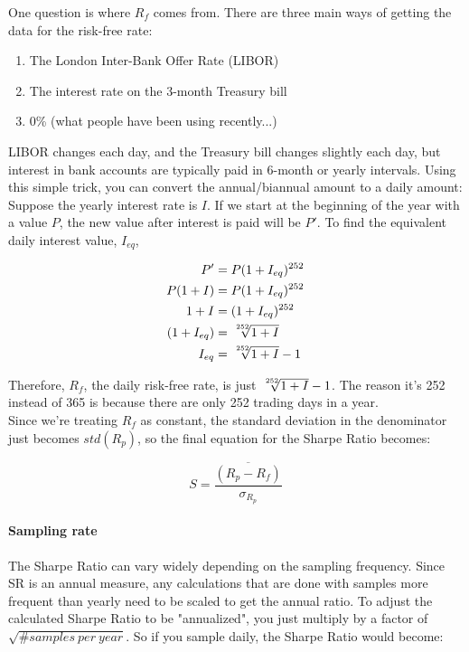 \noindent One question is where $R_f$ comes from. There are three main ways of getting the data for the risk-free rate:
\begin{enumerate}
	\item The London Inter-Bank Offer Rate (LIBOR)
	\item The interest rate on the 3-month Treasury bill
    \item 0\% (what people have been using recently...)
\end{enumerate}

\noindent LIBOR changes each day, and the Treasury bill changes slightly each day, but interest in bank accounts are typically paid in 6-month or yearly intervals. Using this simple trick, you can convert the annual/biannual amount to a daily amount:\\

\noindent Suppose the yearly interest rate is $I$. If we start at the beginning of the year with a value $P$, the new value after interest is paid will be $P'$. To find the equivalent daily interest value, $I_{eq}$,

\begin{align*}
	P' &= P(1+I_{eq})^{252}\\
    P(1+I) &= P(1+I_{eq})^{252}\\
    1+I &= (1+I_{eq})^{252}\\
    (1+I_{eq}) &= \sqrt[\leftroot{-2}\uproot{2}252]{1+I}\\
    I_{eq} &= \sqrt[\leftroot{-2}\uproot{2}252]{1+I} - 1
\end{align*}

\noindent Therefore, $R_f$, the daily risk-free rate, is just $\sqrt[\leftroot{-2}\uproot{2}252]{1+I} - 1$. The reason it's 252 instead of 365 is because there are only 252 trading days in a year.\\

\noindent Since we're treating $R_f$ as constant, the standard deviation in the denominator just becomes $std(R_p)$, so the final equation for the Sharpe Ratio becomes:

\begin{equation*}
	S = \frac{\overline{(R_p - R_f)}}{\sigma_{R_p}}
\end{equation*}

\paragraph{Sampling rate} The Sharpe Ratio can vary widely depending on the sampling frequency. Since SR is an annual measure, any calculations that are done with samples more frequent than yearly need to be scaled to get the annual ratio. To adjust the calculated Sharpe Ratio to be "annualized", you just multiply by a factor of $\sqrt{\# samples\ per\ year}$. So if you sample daily, the Sharpe Ratio would become:

